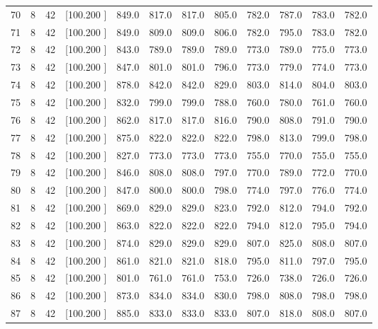\documentclass[12pt,a4paper]{article}
\begin{document}
\begin{center}
{\begin{tabular}{r r r r r r r r r r r r}
  70&  8& 42&[100.200   ]&   849.0&   817.0&   817.0&   805.0&   782.0&   787.0&   783.0&   782.0\\[-0.02in]
  71&  8& 42&[100.200   ]&   849.0&   809.0&   809.0&   806.0&   782.0&   795.0&   783.0&   782.0\\[-0.02in]
  72&  8& 42&[100.200   ]&   843.0&   789.0&   789.0&   789.0&   773.0&   789.0&   775.0&   773.0\\[-0.02in]
  73&  8& 42&[100.200   ]&   847.0&   801.0&   801.0&   796.0&   773.0&   779.0&   774.0&   773.0\\[-0.02in]
  74&  8& 42&[100.200   ]&   878.0&   842.0&   842.0&   829.0&   803.0&   814.0&   804.0&   803.0\\[-0.02in]
  75&  8& 42&[100.200   ]&   832.0&   799.0&   799.0&   788.0&   760.0&   780.0&   761.0&   760.0\\[-0.02in]
  76&  8& 42&[100.200   ]&   862.0&   817.0&   817.0&   816.0&   790.0&   808.0&   791.0&   790.0\\[-0.02in]
  77&  8& 42&[100.200   ]&   875.0&   822.0&   822.0&   822.0&   798.0&   813.0&   799.0&   798.0\\[-0.02in]
  78&  8& 42&[100.200   ]&   827.0&   773.0&   773.0&   773.0&   755.0&   770.0&   755.0&   755.0\\[-0.02in]
  79&  8& 42&[100.200   ]&   846.0&   808.0&   808.0&   797.0&   770.0&   789.0&   772.0&   770.0\\[-0.02in]
  80&  8& 42&[100.200   ]&   847.0&   800.0&   800.0&   798.0&   774.0&   797.0&   776.0&   774.0\\[-0.02in]
  81&  8& 42&[100.200   ]&   869.0&   829.0&   829.0&   823.0&   792.0&   812.0&   794.0&   792.0\\[-0.02in]
  82&  8& 42&[100.200   ]&   863.0&   822.0&   822.0&   822.0&   794.0&   812.0&   795.0&   794.0\\[-0.02in]
  83&  8& 42&[100.200   ]&   874.0&   829.0&   829.0&   829.0&   807.0&   825.0&   808.0&   807.0\\[-0.02in]
  84&  8& 42&[100.200   ]&   861.0&   821.0&   821.0&   818.0&   795.0&   811.0&   797.0&   795.0\\[-0.02in]
  85&  8& 42&[100.200   ]&   801.0&   761.0&   761.0&   753.0&   726.0&   738.0&   726.0&   726.0\\[-0.02in]
  86&  8& 42&[100.200   ]&   873.0&   834.0&   834.0&   830.0&   798.0&   808.0&   798.0&   798.0\\[-0.02in]
  87&  8& 42&[100.200   ]&   885.0&   833.0&   833.0&   833.0&   807.0&   818.0&   808.0&   807.0\\[-0.02in]

\end{tabular}}
\end{center}
\end{document}
